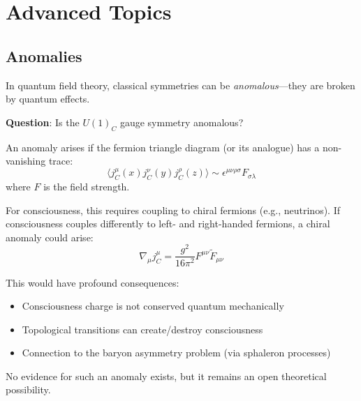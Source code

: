 \section{Advanced Topics}

\begin{advanced}
\subsection{Anomalies}

In quantum field theory, classical symmetries can be \textit{anomalous}---they are broken by quantum effects.

\textbf{Question}: Is the $U(1)_C$ gauge symmetry anomalous?

An anomaly arises if the fermion triangle diagram (or its analogue) has a non-vanishing trace:
\begin{equation}
\langle j^\mu_C(x) j^\nu_C(y) j^\rho_C(z) \rangle \sim \epsilon^{\mu\nu\rho\sigma} F_{\sigma\lambda}
\end{equation}
where $F$ is the field strength.

For consciousness, this requires coupling to chiral fermions (e.g., neutrinos). If consciousness couples differently to left- and right-handed fermions, a chiral anomaly could arise:
\begin{equation}
\nabla_\mu j^\mu_C = \frac{g^2}{16\pi^2} F^{\mu\nu} \tilde{F}_{\mu\nu}
\end{equation}

This would have profound consequences:
\begin{itemize}
\item Consciousness charge is not conserved quantum mechanically
\item Topological transitions can create/destroy consciousness
\item Connection to the baryon asymmetry problem (via sphaleron processes)
\end{itemize}

No evidence for such an anomaly exists, but it remains an open theoretical possibility.
\end{advanced}


